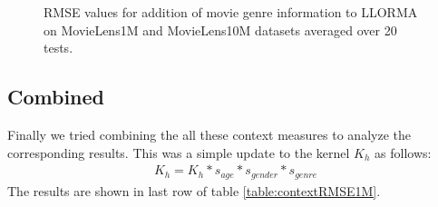 \documentclass[10 pt,table]{article}  %
\begin{document}
\begin{figure}[t!]
\centering
\caption{\small RMSE values for addition of movie genre information to LLORMA on MovieLens1M and MovieLens10M datasets averaged over 20 tests.}
\label{fig:TCH_2DTraj1}\vspace{-4mm}
\end{figure}


\subsection{Combined}
Finally we tried combining the all these context measures to analyze the corresponding results. This was a simple update to the kernel $K_h$ as follows:
\begin{align}
K_h = K_h *s_{age}*s_{gender}*s_{genre}
\end{align}
The results are shown in last row of table \ref{table:contextRMSE1M}.
\end{document}
